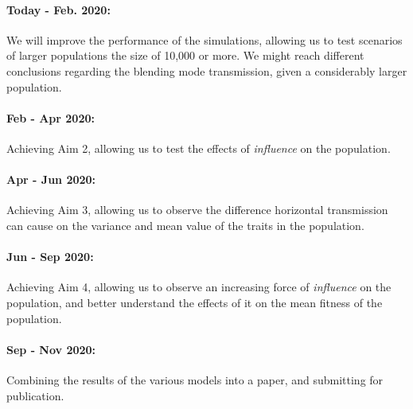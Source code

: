 \documentclass[11pt]{article}
\begin{document}
\paragraph*{Today - Feb. 2020:} 
We will improve the performance of the simulations, allowing us to test scenarios of larger populations the size of 10,000 or more.
We might reach different conclusions regarding the blending mode transmission, given a considerably larger population.

\paragraph*{Feb - Apr 2020:}
Achieving Aim 2, allowing us to test the effects of \textit{influence} on the population.

\paragraph*{Apr - Jun 2020:}
Achieving Aim 3, allowing us to observe the difference horizontal transmission can cause on the variance and mean value of the traits in the population.

\paragraph*{Jun - Sep 2020:}
Achieving Aim 4, allowing us to observe an increasing force of \textit{influence} on the population, and better understand the effects of it on the mean fitness of the population.

\paragraph*{Sep - Nov 2020:}
Combining the results of the various models into a paper, and submitting for publication.


\clearpage


\end{document}
